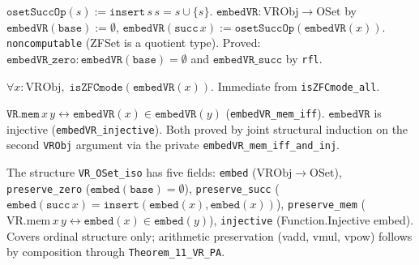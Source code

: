 \begin{definition}
\label{def:embedVR}
\leanok
{}
$\texttt{osetSuccOp}(s) := \texttt{insert}\,s\,s = s \cup \{s\}$.
$\texttt{embedVR} : \mathrm{VRObj} \to \mathrm{OSet}$ by
$\texttt{embedVR}(\texttt{base}) := \emptyset$,
$\texttt{embedVR}(\texttt{succ}\,x) := \texttt{osetSuccOp}(\texttt{embedVR}(x))$.
\texttt{noncomputable} (ZFSet is a quotient type).
Proved: $\texttt{embedVR\_zero} : \texttt{embedVR}(\texttt{base}) = \emptyset$
and $\texttt{embedVR\_succ}$ by \texttt{rfl}.
\end{definition}

\begin{theorem}
\label{thm:Theorem_V_1}
\leanok
{}
$\forall x : \mathrm{VRObj},\; \texttt{isZFCmode}(\texttt{embedVR}(x))$.
Immediate from \texttt{isZFCmode\_all}.
\end{theorem}

\begin{theorem}
\label{thm:embedVR_props}
\leanok
{}
$\texttt{VR.mem}\,x\,y \leftrightarrow \texttt{embedVR}(x) \in
\texttt{embedVR}(y)$ (\texttt{embedVR\_mem\_iff}).
$\texttt{embedVR}$ is injective (\texttt{embedVR\_injective}).
Both proved by joint structural induction on the second \texttt{VRObj}
argument via the private \texttt{embedVR\_mem\_iff\_and\_inj}.
\end{theorem}

\begin{definition}
\label{def:VR_OSet_iso}
\leanok
{}
The structure \texttt{VR\_OSet\_iso} has five fields:
\texttt{embed} ($\mathrm{VRObj} \to \mathrm{OSet}$),
\texttt{preserve\_zero} ($\texttt{embed}(\texttt{base}) = \emptyset$),
\texttt{preserve\_succ} ($\texttt{embed}(\texttt{succ}\,x) = \texttt{insert}(\texttt{embed}(x), \texttt{embed}(x))$),
\texttt{preserve\_mem} ($\mathrm{VR.mem}\,x\,y \leftrightarrow \texttt{embed}(x) \in \texttt{embed}(y)$),
\texttt{injective} (Function.Injective embed).
Covers ordinal structure only; arithmetic preservation (vadd, vmul, vpow)
follows by composition through \texttt{Theorem\_11\_VR\_PA}.
\end{definition}

